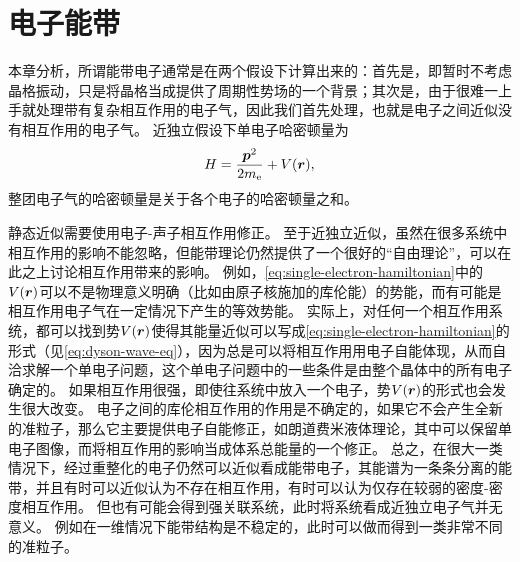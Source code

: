 \chapter{电子能带}\label{sec:electron-band-structure}

本章分析，所谓能带电子通常是在两个假设下计算出来的：首先是，即暂时不考虑晶格振动，只是将晶格当成提供了周期性势场的一个背景；其次是，由于很难一上手就处理带有复杂相互作用的电子气，因此我们首先处理，也就是电子之间近似没有相互作用的电子气。
近独立假设下单电子哈密顿量为
\begin{equation}
    {H} = \frac{{\vb*{p}}^2}{2m_\text{e}} + V(\vb*{r}),
    \label{eq:single-electron-hamiltonian}
\end{equation}
整团电子气的哈密顿量是关于各个电子的哈密顿量之和。

静态近似需要使用电子-声子相互作用修正。
至于近独立近似，虽然在很多系统中相互作用的影响不能忽略，但能带理论仍然提供了一个很好的“自由理论”，可以在此之上讨论相互作用带来的影响。
例如，\eqref{eq:single-electron-hamiltonian}中的$V(\vb*{r})$可以不是物理意义明确（比如由原子核施加的库伦能）的势能，而有可能是相互作用电子气在一定情况下产生的等效势能。
实际上，对任何一个相互作用系统，都可以找到势$V(\vb*{r})$使得其能量近似可以写成\eqref{eq:single-electron-hamiltonian}的形式（见\eqref{eq:dyson-wave-eq}），因为总是可以将相互作用用电子自能体现，从而自洽求解一个单电子问题，这个单电子问题中的一些条件是由整个晶体中的所有电子确定的。
如果相互作用很强，即使往系统中放入一个电子，势$V(\vb*{r})$的形式也会发生很大改变。
电子之间的库伦相互作用的作用是不确定的，如果它不会产生全新的准粒子，那么它主要提供电子自能修正，如朗道费米液体理论，其中可以保留单电子图像，而将相互作用的影响当成体系总能量的一个修正。
总之，在很大一类情况下，经过重整化的电子仍然可以近似看成能带电子，其能谱为一条条分离的能带，并且有时可以近似认为不存在相互作用，有时可以认为仅存在较弱的密度-密度相互作用。
但也有可能会得到强关联系统，此时将系统看成近独立电子气并无意义。
例如在一维情况下能带结构是不稳定的，此时可以做而得到一类非常不同的准粒子。

